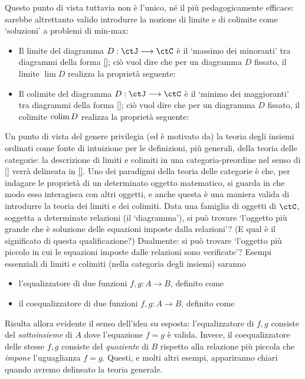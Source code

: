 Questo punto di vista tuttavia non è l'unico, né il più pedagogicamente efficace: sarebbe altrettanto valido introdurre la nozione di limite e di colimite come `soluzioni' a problemi di min-max:
\begin{itemize}
	\item Il limite del diagramma \(D : \ctJ\fun\ctC\) è il `massimo dei minoranti' tra diagrammi della forma \eqref{}; ciò vuol dire che per un diagramma \(D\) fissato, il limite \(\lim D\) realizza la proprietà seguente:
	      \Todo{}
	\item Il colimite del diagramma \(D : \ctJ\fun\ctC\) è il `minimo dei maggioranti' tra diagrammi della forma \eqref{}; ciò vuol dire che per un diagramma \(D\) fissato, il colimite \(\operatorname*{colim} D\) realizza la proprietà seguente:
	      \Todo{}
\end{itemize}
Un punto di vista del genere privilegia (ed è motivato da) la teoria degli insiemi ordinati come fonte di intuizione per le definizioni, più generali, della teoria delle categorie: la descrizione di limiti e colimiti in una categoria-preordine nel senso di \ref{} verrà delineata in \ref{}.
\Todo{}
Uno dei paradigmi della teoria delle categorie è che, per indagare le proprietà di un determinato oggetto matematico, si guarda in che modo esso interagisca con  altri oggetti, e anche questa è una maniera valida di introdurre la teoria dei limiti e dei colimiti. Data una famiglia di oggetti di \(\ctC\), soggetta a determinate relazioni (il `diagramma'), si può trovare `l'oggetto più grande che è soluzione delle equazioni imposte dalla relazioni'? (E qual è il significato di questa qualificazione?) Dualmente: si può trovare `l'oggetto più piccolo in cui le equazioni imposte dalle relazioni sono verificate'?
\Todo{}
Esempi essenziali di limiti e colimiti (nella categoria degli insiemi) saranno
\begin{itemize}
	\item l'equalizzatore di due funzioni \(f,g : A \to B\), definito come
	      \Todo{}
	\item il coequalizzatore di due funzioni \(f,g : A \to B\), definito come
	      \Todo{}
\end{itemize}
Risulta allora evidente il senso dell'idea su esposta: l'equalizzatore di \(f,g\) consiste del \emph{sottoinsieme} di \(A\) dove l'equazione \(f=g\) è valida. Invece, il coequalizzatore delle stesse \(f,g\) consiste del \emph{quoziente} di \(B\) rispetto alla relazione più piccola che \emph{impone} l'uguaglianza \(f=g\).
\Todo{}
Questi, e molti altri esempi, appariranno chiari quando avremo delineato la teoria generale.
